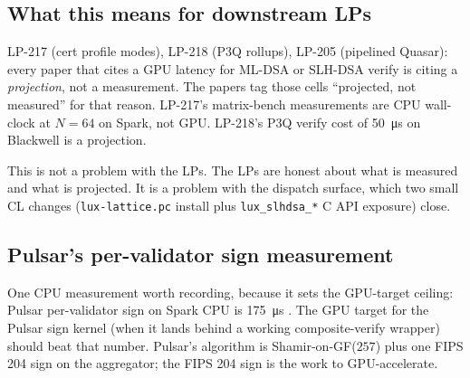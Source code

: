 \subsection{What this means for downstream LPs}

LP-217 \cite{lp217} (cert profile modes), LP-218 \cite{lp218}
(P3Q rollups), LP-205 (pipelined Quasar): every paper that
cites a GPU latency for ML-DSA or SLH-DSA verify is citing a
\emph{projection}, not a measurement. The papers tag those
cells ``projected, not measured'' for that reason. LP-217's
matrix-bench measurements are CPU wall-clock at $N{=}64$ on
Spark, not GPU. LP-218's P3Q verify cost of
\SI{50}{\micro\second} on Blackwell is a projection.

This is not a problem with the LPs. The LPs are honest about
what is measured and what is projected. It is a problem with
the dispatch surface, which two small CL changes
(\texttt{lux-lattice.pc} install plus
\texttt{lux\_slhdsa\_*} C API exposure) close.

\subsection{Pulsar's per-validator sign measurement}

One CPU measurement worth recording, because it sets the
GPU-target ceiling: Pulsar per-validator sign on Spark CPU is
\SI{175}{\micro\second} \cite{paritytest}. The GPU target for
the Pulsar sign kernel (when it lands behind a working
composite-verify wrapper) should beat that number. Pulsar's
algorithm \cite{lp073} is Shamir-on-GF($257$) plus one FIPS 204
sign \cite{fips204} on the aggregator; the FIPS 204 sign is the
work to GPU-accelerate.
